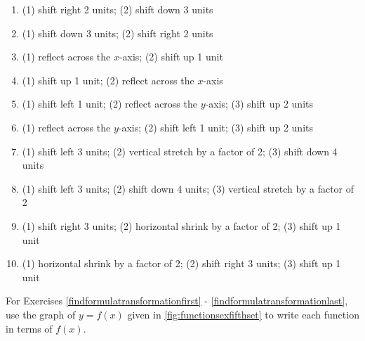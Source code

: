 \begin{enumerate}
\setcounter{enumi}{\value{HW}}


\item  (1) shift right 2 units; (2) shift down 3 units

\item  (1) shift down 3 units; (2) shift right 2 units

\item  (1) reflect across the $x$-axis; (2) shift up 1 unit

\item  (1) shift up 1 unit; (2) reflect across the $x$-axis

\item  (1) shift left 1 unit; (2) reflect across the $y$-axis; (3) shift up 2 units

\item  (1) reflect across the $y$-axis;  (2) shift left 1 unit;  (3) shift up 2 units

\item  (1) shift left 3 units; (2) vertical stretch by a factor of 2; (3) shift down 4 units

\item  (1) shift left 3 units; (2) shift down 4 units; (3) vertical stretch by a factor of 2

\item  (1) shift right 3 units; (2) horizontal shrink by a factor of 2; (3) shift up 1 unit

\item  (1) horizontal shrink by a factor of 2; (2) shift right 3 units; (3) shift up 1 unit


\setcounter{HW}{\value{enumi}}
\end{enumerate}

For Exercises \ref{findformulatransformationfirst} - \ref{findformulatransformationlast},  use the graph of $y = f(x)$ given in \autoref{fig:functionsexfifthset} to write each function in terms of $f(x)$.

